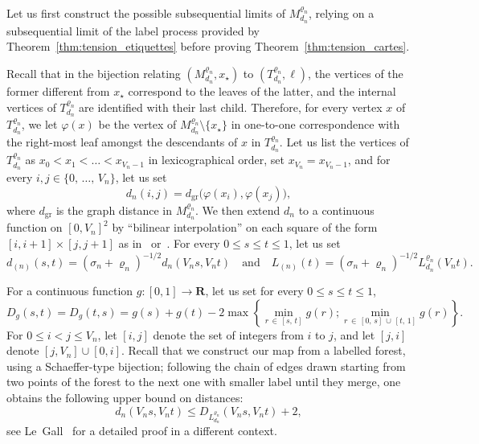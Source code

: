 \documentclass[10pt]{amsart}
\theoremstyle{definition}\newtheorem{defi}[theo]{Definition}\newtheorem{rema}[theo]{Remark}\newtheorem{exam}[theo]{Example}\newtheorem{exem}[theo]{Example}\newtheorem{nota}[theo]{Notation}
\newcommand{\ensembles}[1]{\mathbf{#1}}
\newcommand{\R}{\ensembles{R}}
\newcommand{\1}{\ensembles{1}}
\renewcommand{\le}{\leqslant}
\newcommand{\mn}{M_{d_n}^{\varrho_n}}
\newcommand{\dgr}{d_{\mathrm{gr}}}
\newcommand{\fn}{T_{d_n}^{\varrho_n}}
\newcommand{\Lfn}{L_{d_n}^{\varrho_n}}
\newcommand{\vertices}{V}
\providecommand{\?}{}
\begin{document}
Let us first construct the possible subsequential limits of $\mn$, relying on a subsequential limit of the label process provided by Theorem~\ref{thm:tension_etiquettes} before proving Theorem~\ref{thm:tension_cartes}.

Recall that in the bijection relating $(\mn, x_\star)$ to $(\fn, \ell)$, the vertices of the former different from $x_\star$ correspond to the leaves of the latter, and the internal vertices of $\fn$ are identified with their last child. Therefore, for every vertex $x$ of $\fn$, we let $\varphi(x)$ be the vertex of $\mn\setminus\{x_\star\}$ in one-to-one correspondence with the right-most leaf amongst the descendants of $x$ in $\fn$. Let us list the vertices of $\fn$ as $x_0 < x_1 < \dots < x_{\vertices_n-1}$ in lexicographical order, set $x_{\vertices_n} = x_{\vertices_n-1}$, and for every $i,j \in \{0,\, \dots,\,\vertices_n\}$, let us set
\[
d_n(i,j) = \dgr\big(\varphi(x_i), \varphi(x_j)\big),
\]
where $\dgr$ is the graph distance in $\mn$. We then extend $d_n$ to a continuous function on $[0, \vertices_n]^2$ by ``bilinear interpolation'' on each square of the form $[i,i+1] \times [j,j+1]$ as in~\cite[Section~2.5]{LG13} or~\cite[Section~7]{LGM11}. For every $0 \le s \le t \le 1$, let us set
\[
d_{(n)}(s, t) = \left(\sigma_n + \varrho_n\right)^{-1/2} d_n\left(\vertices_n s, \vertices_n t\right)\quad\text{and}\quad L_{(n)}(t) = \left(\sigma_n + \varrho_n\right)^{-1/2} \Lfn\left(\vertices_n t\right).
\]



For a continuous function $g : [0, 1] \to \R$, let us set for every $0 \le s \le t \le 1$,
\begin{equation}\label{eq:distance_fonction_continue}
D_g(s,t) = D_g(t,s) = g(s) + g(t) - 2 \max\left\{\min_{r\,\in\,[s,\,t]} g(r); \min_{r\, \in\,[0,\,s]\,\cup\,[t,\,1]} g(r)\right\}.
\end{equation}
For $0 \le i < j \le \vertices_n$, let $[i, j]$ denote the set of integers from $i$ to $j$, and let $[j,i]$ denote $[j, \vertices_n] \cup [0, i]$. Recall that we construct our map from a labelled forest, using a Schaeffer-type bijection; following the chain of edges drawn starting from two points of the forest to the next one with smaller label until they merge, one obtains the following upper bound on distances:
\begin{equation}\label{eq:borne_sup_cactus}
d_n\left(\vertices_n s, \vertices_n t\right) \le D_{\Lfn}\left(\vertices_n s, \vertices_n t\right) + 2,
\end{equation}
see Le~Gall~\cite[Lemma~3.1]{LG07} for a detailed proof in a different context.
\end{document}

